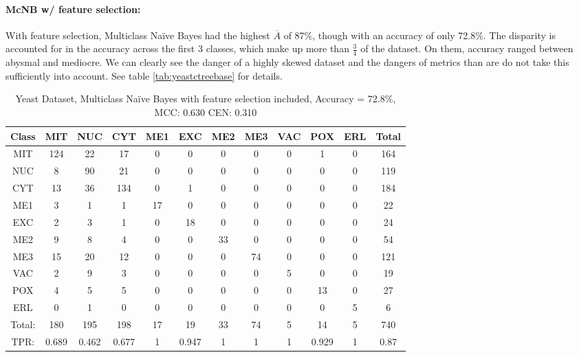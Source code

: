 \begin{table}[h!]
\paragraph{McNB w/ feature selection:}
With feature selection, Multiclass Na\"ive Bayes had the highest $\overline{A}$ of 87\%, though with an accuracy of only 72.8\%.  The disparity is accounted for in the accuracy across the first 3 classes, which make up more than $\frac{3}{4}$ of the dataset.  On them, accuracy ranged between abysmal and mediocre.  We can clearly see the danger of a highly skewed dataset and the dangers of metrics than are do not take this sufficiently into account.  See table \ref{tab:yeastctreebase} for details.
\\
\begin{tabular}{|c|c|c|c|c|c|c|c|c|c|c|c|}
	\hline
Class&MIT&NUC&CYT&ME1&EXC&ME2&ME3&VAC&POX&ERL&Total\\
\hline
MIT&124&22&17&0&0&0&0&0&1&0&164\\
NUC&8&90&21&0&0&0&0&0&0&0&119\\
CYT&13&36&134&0&1&0&0&0&0&0&184\\
ME1&3&1&1&17&0&0&0&0&0&0&22\\
EXC&2&3&1&0&18&0&0&0&0&0&24\\
ME2&9&8&4&0&0&33&0&0&0&0&54\\
ME3&15&20&12&0&0&0&74&0&0&0&121\\
VAC&2&9&3&0&0&0&0&5&0&0&19\\
POX&4&5&5&0&0&0&0&0&13&0&27\\
ERL&0&1&0&0&0&0&0&0&0&5&6\\
\hline
Total:&180&195&198&17&19&33&74&5&14&5&740\\
TPR:&0.689&0.462&0.677&1&0.947&1&1&1&0.929&1&0.87\\
\hline
\end{tabular}
\caption[Yeast: Multiclass Na\"ive Bayes with Feature Selection Confusion Matrix]{Yeast Dataset, Multiclass Na\"ive Bayes with feature selection included, Accuracy = 72.8\%, MCC: 0.630 CEN: 0.310}
\label{tab:yeastmcnbfeatures}
\end{table}


